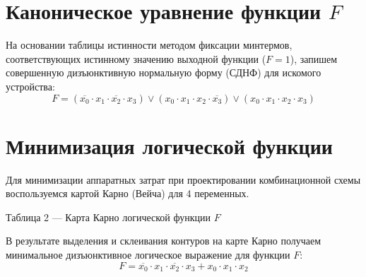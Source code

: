 \documentclass[oneside,a4paper,14pt]{extarticle}
\begin{document}
\section{Каноническое уравнение функции $F$}
На основании таблицы истинности методом фиксации минтермов, соответствующих истинному значению выходной функции ($F=1$), запишем совершенную дизъюнктивную нормальную форму (СДНФ) для искомого устройства:
\begin{equation*}
F = (\overline{x_0} \cdot x_1 \cdot \overline{x_2} \cdot x_3) \vee (x_0 \cdot x_1 \cdot x_2 \cdot \overline{x_3}) \vee (x_0 \cdot x_1 \cdot x_2 \cdot x_3)
\end{equation*}

\section{Минимизация логической функции}
Для минимизации аппаратных затрат при проектировании комбинационной схемы воспользуемся картой Карно (Вейча) для 4 переменных.

\begin{center}
  Таблица 2 --- Карта Карно логической функции $F$ \\
  \vspace{5mm}
\end{center}
В результате выделения и склеивания контуров на карте Карно получаем минимальное дизъюнктивное логическое выражение для функции $F$:
\begin{equation*}
  F =  \overline{x_0}  \cdot x_1 \cdot  \overline{x_2}  \cdot x_3+x_0 \cdot x_1 \cdot x_2
\end{equation*}
\end{document}
